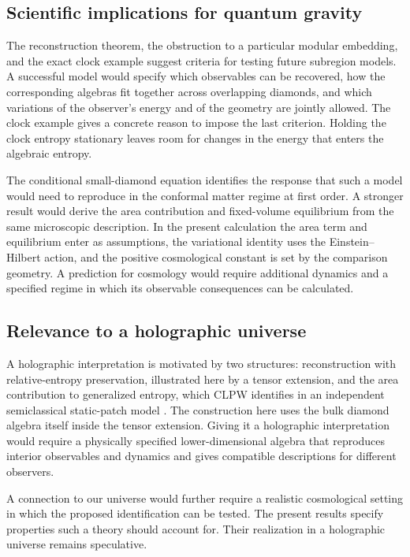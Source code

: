 \documentclass[11pt,a4paper]{article}
\numberwithin{equation}{section}
\theoremstyle{remark}
\begin{document}
\subsection{Scientific implications for quantum gravity}

The reconstruction theorem, the obstruction to a particular modular embedding, and the exact clock example suggest criteria for testing future subregion models. A successful model would specify which observables can be recovered, how the corresponding algebras fit together across overlapping diamonds, and which variations of the observer's energy and of the geometry are jointly allowed. The clock example gives a concrete reason to impose the last criterion. Holding the clock entropy stationary leaves room for changes in the energy that enters the algebraic entropy.

The conditional small-diamond equation identifies the response that such a model would need to reproduce in the conformal matter regime at first order. A stronger result would derive the area contribution and fixed-volume equilibrium from the same microscopic description. In the present calculation the area term and equilibrium enter as assumptions, the variational identity uses the Einstein--Hilbert action, and the positive cosmological constant is set by the comparison geometry. A prediction for cosmology would require additional dynamics and a specified regime in which its observable consequences can be calculated.

\subsection{Relevance to a holographic universe}

A holographic interpretation is motivated by two structures: reconstruction with relative-entropy preservation, illustrated here by a tensor extension, and the area contribution to generalized entropy, which CLPW identifies in an independent semiclassical static-patch model \cite{Bousso2002,CLPW2022}. The construction here uses the bulk diamond algebra itself inside the tensor extension. Giving it a holographic interpretation would require a physically specified lower-dimensional algebra that reproduces interior observables and dynamics and gives compatible descriptions for different observers.

A connection to our universe would further require a realistic cosmological setting in which the proposed identification can be tested. The present results specify properties such a theory should account for. Their realization in a holographic universe remains speculative.
\end{document}
